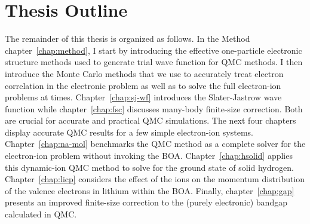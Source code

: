 \section{Thesis Outline}
The remainder of this thesis is organized as follows. In the Method chapter~\ref{chap:method}, I start by introducing the effective one-particle electronic structure methods used to generate trial wave function for QMC methods.
I then introduce the Monte Carlo methods that we use to accurately treat electron correlation in the electronic problem as well as to solve the full electron-ion problems at times.
Chapter~\ref{chap:sj-wf} introduces the Slater-Jastrow wave function while chapter~\ref{chap:fsc} discusses many-body finite-size correction.
Both are crucial for accurate and practical QMC simulations.
The next four chapters display accurate QMC results for a few simple electron-ion systems.
Chapter~\ref{chap:na-mol} benchmarks the QMC method as a complete solver for the electron-ion problem without invoking the BOA.
Chapter~\ref{chap:hsolid} applies this dynamic-ion QMC method to solve for the ground state of solid hydrogen.
Chapter~\ref{chap:licp} considers the effect of the ions on the momentum distribution of the valence electrons in lithium within the BOA.
Finally, chapter~\ref{chap:gap} presents an improved finite-size correction to the (purely electronic) bandgap calculated in QMC.
